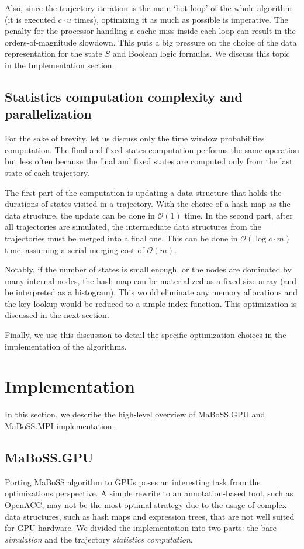 \documentclass[times, twoside]{zHenriquesLab-StyleBioRxiv}
\begin{document}
Also, since the trajectory iteration is the main `hot loop' of the whole algorithm (it is executed $c \cdot u$ times), optimizing it as much as possible is imperative. The penalty for the processor handling a cache miss inside each loop can result in the orders-of-magnitude slowdown. This puts a big pressure on the choice of the data representation for the state $S$ and Boolean logic formulas. We discuss this topic in the Implementation section. 

\subsection*{Statistics computation complexity and parallelization}

For the sake of brevity, let us discuss only the time window probabilities computation. The final and fixed states computation performs the same operation but less often because the final and fixed states are computed only from the last state of each trajectory.

The first part of the computation is updating a data structure that holds the durations of states visited in a trajectory. With the choice of a hash map as the data structure, the update can be done in $\mathcal{O}(1)$ time. In the second part, after all trajectories are simulated, the intermediate data structures from the trajectories must be merged into a final one. This can be done in $\mathcal{O}(\log{c} \cdot m)$ time, assuming a serial merging cost of $\mathcal{O}(m)$.

Notably, if the number of states is small enough, or the nodes are dominated by many internal nodes, the hash map can be materialized as a fixed-size array (and be interpreted as a histogram). This would eliminate any memory allocations and the key lookup would be reduced to a simple index function. This optimization is discussed in the next section.

Finally, we use this discussion to detail the specific optimization choices in the implementation of the algorithms.

\section*{Implementation}\label{sec:implementation}

In this section, we describe the high-level overview of MaBoSS.GPU and MaBoSS.MPI implementation.

\subsection*{MaBoSS.GPU}
Porting MaBoSS algorithm to GPUs poses an interesting task from the optimizations perspective. A simple rewrite to an annotation-based tool, such as OpenACC, may not be the most optimal strategy due to the usage of complex data structures, such as hash maps and expression trees, that are not well suited for GPU hardware. We divided the implementation into two parts: the bare \emph{simulation} and the trajectory \emph{statistics computation}. 
\end{document}
